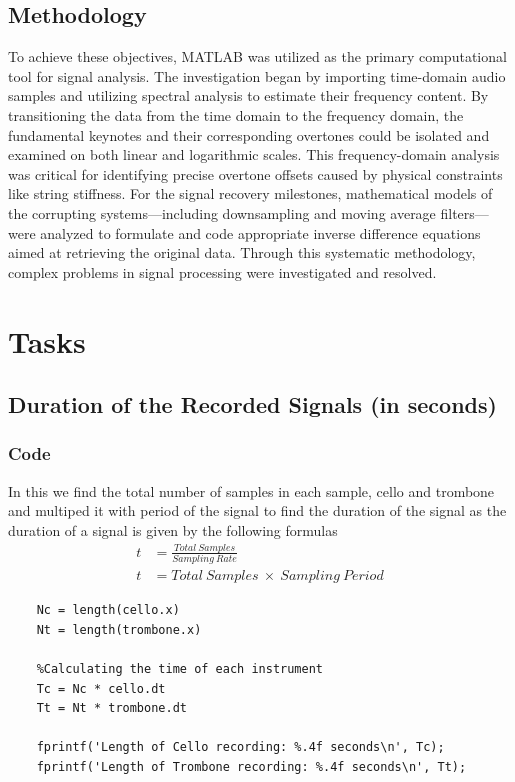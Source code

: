 \documentclass[12pt, a4paper]{article}
\begin{document}
\subsection{Methodology}
To achieve these objectives, MATLAB was utilized as the primary computational tool for signal analysis. The investigation began by importing time-domain audio samples and utilizing spectral analysis to estimate their frequency content. By transitioning the data from the time domain to the frequency domain, the fundamental keynotes and their corresponding overtones could be isolated and examined on both linear and logarithmic scales. This frequency-domain analysis was critical for identifying precise overtone offsets caused by physical constraints like string stiffness. For the signal recovery milestones, mathematical models of the corrupting systems—including downsampling and moving average filters—were analyzed to formulate and code appropriate inverse difference equations aimed at retrieving the original data. Through this systematic methodology, complex problems in signal processing were investigated and resolved.

\section{Tasks}
\subsection{Duration of the Recorded Signals (in seconds)}
\subsubsection{Code}
In this we find the total number of samples in each sample, cello and trombone and multiped it with period of the signal to find the duration of the signal as the duration of a signal is given by the following formulas
\begin{align*}
    t & = \frac{Total\ Samples}{Sampling\ Rate}    \\
    t & = Total\ Samples\ \times\ Sampling\ Period
\end{align*}
\begin{lstlisting}[style=matlabstyle]
    %Calculating the number of samples in cello and trombone
    Nc = length(cello.x)
    Nt = length(trombone.x)

    %Calculating the time of each instrument
    Tc = Nc * cello.dt
    Tt = Nt * trombone.dt
    
    fprintf('Length of Cello recording: %.4f seconds\n', Tc);
    fprintf('Length of Trombone recording: %.4f seconds\n', Tt);
\end{lstlisting}
\end{document}
